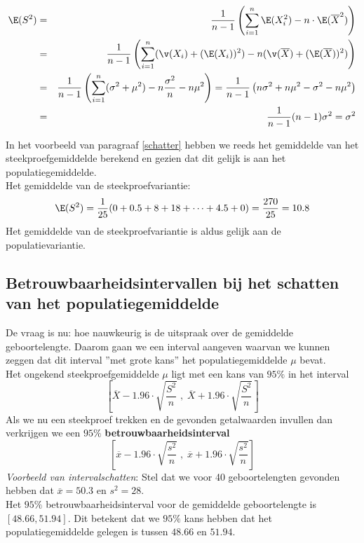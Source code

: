 {\begin{enumerate}
\begin{eqnarray*}
\E(S^2)& =& \frac{1}{n-1}\left(\sum_{i=1}^n\E(X_i^2)-n\cdot\E(\overline{X}^2)\right)\\
&=& \frac{1}{n-1}\left(\sum_{i=1}^n(\v(X_i)+(\E(X_i))
^2)-n(\v(\overline{X})+(\E(\overline{X}))^2)\right)\\
 & = & \frac{1}{n-1}\left(\sum_{i=1}^n(\sigma^2+\mu^2)-n\frac{\sigma^2}{n}-n\mu^2\right)=\frac{1}{n-1}\left(n\sigma^2+n\mu^2-\sigma^2-n\mu^2\right)\\
&=&\frac{1}{n-1}(n-1)\sigma^2=\sigma^2
\end{eqnarray*}
\end{enumerate}
In het voorbeeld van paragraaf \ref{schatter} hebben we reeds het gemiddelde van het steekproefgemiddelde berekend en gezien dat dit gelijk is aan het populatiegemiddelde. \\Het gemiddelde van de steekproefvariantie:
$$\E(S^2)=\frac{1}{25}(0+0.5+8+18+\cdots +4.5+0)=\frac{270}{25}=10.8$$
Het gemiddelde van de steekproefvariantie is aldus gelijk aan de populatievariantie. 
\newpage








\subsection{Betrouwbaarheidsintervallen bij het schatten van het populatiegemiddelde}
De vraag is nu: hoe nauwkeurig is de uitspraak over de gemiddelde geboortelengte. Daarom gaan we een interval aangeven waarvan we kunnen zeggen dat dit interval ''met grote kans'' het populatiegemiddelde $\mu$ bevat.\\Het ongekend steekproefgemiddelde $\mu$ ligt met een kans van  $95\%$ in het interval
$$\left[\overline{X}-1.96\cdot \sqrt{\frac{S^2}{n}}\; ,\; \overline{X}+1.96\cdot \sqrt{\frac{S^2}{n}}\right]$$
Als we nu een steekproef trekken en de gevonden getalwaarden invullen dan verkrijgen we een $95\%$ \textbf{betrouwbaarheidsinterval} 
$$\left[\overline{x}-1.96\cdot \sqrt{\frac{s^2}{n}}\; ,\; \overline{x}+1.96\cdot \sqrt{\frac{s^2}{n}}\right]$$
{\em Voorbeeld van intervalschatten}: Stel dat we voor  40 geboortelengten gevonden hebben dat $\overline{x}=50.3$ en $s^2=28$.\\
Het $95\%$ betrouwbaarheidsinterval voor de gemiddelde geboortelengte is $[48.66,51.94]$. Dit betekent dat we   $95\%$ kans hebben dat het populatiegemiddelde gelegen is tussen $48.66$ en $51.94$.

}
